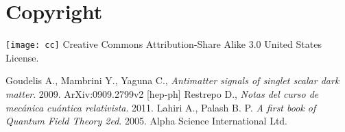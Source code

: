 \section{Copyright}
\texttt{[image: cc]} Creative Commons Attribution-Share Alike 3.0 United States License.



\begin{thebibliography}{}
 Goudelis A., Mambrini Y., Yaguna C., \textit{Antimatter signals of singlet scalar dark matter}. 2009. ArXiv:0909.2799v2 [hep-ph]
 Restrepo D., \textit{Notas del curso de mecánica cuántica relativista}. 2011.
 Lahiri A., Palash B. P. \textit{A first book of Quantum Field Theory 2ed}. 2005. Alpha Science International Ltd.
\end{thebibliography}


